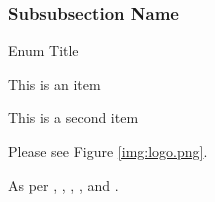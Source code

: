 \documentclass{Style}
\begin{document}
\subsubsection{Subsubsection Name}
\lipsum[80]
\begin{niceenum}{Enum Title}
	\item This is an item
	\item This is a second item	
	\item {}
\end{niceenum}
\lipsum[40]

\lipsum[100]


\lipsum[40]

\lipsum[40] Please see Figure \ref{img:logo.png}.


\lipsum[100]

\lipsum[100] As per \parencite{kopka2003guide}, \parencite{mittelbach2004latex}, \parencite{hahn1993latex}, \parencite{long2015concept}, and \parencite{griffiths1997learning}.

\printbibliography
\end{document}
